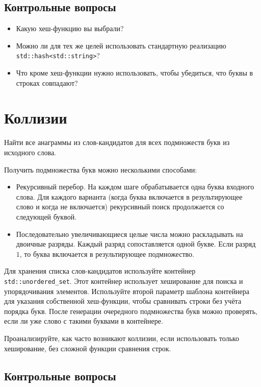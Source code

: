 \documentclass[10pt,twoside,openany]{book}
\begin{document}
\subsection*{Контрольные вопросы}

\begin{itemize}
    \item Какую хеш-функцию вы выбрали?
    \item Можно ли для тех же целей использовать стандартную
          реализацию {\tt std::hash<std::string>}?
    \item Что кроме хеш-функции нужно использовать, чтобы убедиться, что буквы в строках совпадают?
\end{itemize}

\section{Коллизии}

Найти все анаграммы из слов-кандидатов для всех подмножеств букв из исходного слова.

Получить подмножества букв можно несколькими способами:
\begin{itemize}
    \item Рекурсивный перебор. На каждом шаге обрабатывается одна буква входного слова.
          Для каждого варианта (когда буква включается в результирующее слово и когда не включается)
          рекурсивный поиск продолжается со следующей буквой.
    \item Последовательно увеличивающиеся целые числа можно раскладывать на двоичные разряды.
          Каждый разряд сопоставляется одной букве. Если разряд $1$, то буква включается
          в результирующее подмножество.
\end{itemize}

Для хранения списка слов-кандидатов используйте контейнер {\tt std::unordered\_set}.
Этот контейнер использует хеширование для поиска и упорядочивания элементов.
Используйте второй параметр шаблона контейнера для указания собственной хеш-функции,
чтобы сравнивать строки без учёта порядка букв.
После генерации очередного подмножества букв можно проверять, если ли уже слово с такими
буквами в контейнере.

Проанализируйте, как часто возникают коллизии, если использовать только хеширование,
без сложной функции сравнения строк.

\subsection*{Контрольные вопросы}
\end{document}
